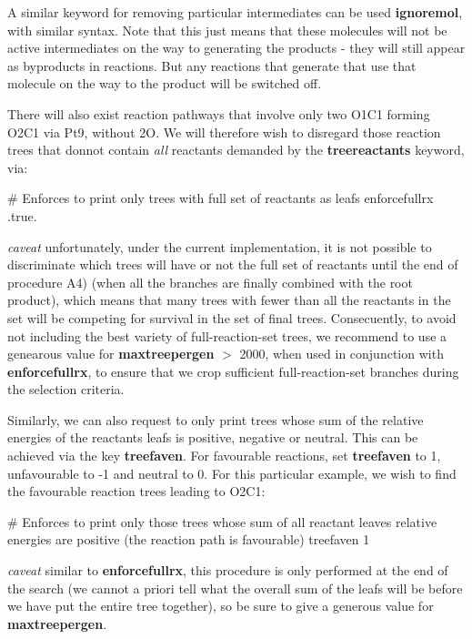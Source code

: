 A similar keyword for removing particular intermediates can be used {\bfseries ignoremol}, with similar syntax. Note that this just means that these molecules will not be active intermediates on the way to generating the products -\/ they will still appear as byproducts in reactions. But any reactions that generate that use that molecule on the way to the product will be switched off.

There will also exist reaction pathways that involve only two O1\+C1 forming O2\+C1 via Pt9, without 2O. We will therefore wish to disregard those reaction trees that donnot contain {\itshape all} reactants demanded by the {\bfseries treereactants} keyword, via\+: \begin{DoxyVerb}# Enforces to print only trees with full set of reactants as leafs
enforcefullrx .true.
\end{DoxyVerb}


{\itshape caveat} unfortunately, under the current implementation, it is not possible to discriminate which trees will have or not the full set of reactants until the end of procedure A4) (when all the branches are finally combined with the root product), which means that many trees with fewer than all the reactants in the set will be competing for survival in the set of final trees. Consecuently, to avoid not including the best variety of full-\/reaction-\/set trees, we recommend to use a genearous value for {\bfseries maxtreepergen} $>$ 2000, when used in conjunction with {\bfseries enforcefullrx}, to ensure that we crop sufficient full-\/reaction-\/set branches during the selection criteria.

Similarly, we can also request to only print trees whose sum of the relative energies of the reactants leafs is positive, negative or neutral. This can be achieved via the key {\bfseries treefaven}. For favourable reactions, set {\bfseries treefaven} to 1, unfavourable to -\/1 and neutral to 0. For this particular example, we wish to find the favourable reaction trees leading to O2\+C1\+: \begin{DoxyVerb}#  Enforces to print only those trees whose sum of all reactant leaves relative energies are positive (the reaction path is favourable)
treefaven 1
\end{DoxyVerb}


{\itshape caveat} similar to {\bfseries enforcefullrx}, this procedure is only performed at the end of the search (we cannot a priori tell what the overall sum of the leafs will be before we have put the entire tree together), so be sure to give a generous value for {\bfseries maxtreepergen}.


